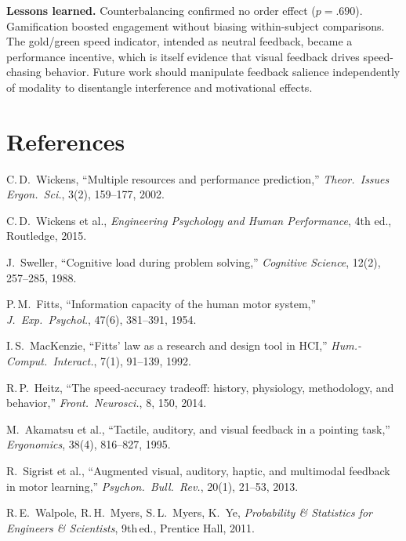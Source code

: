 \documentclass[12pt,letterpaper]{article}
\begin{document}
\textbf{Lessons learned.} Counterbalancing confirmed no order effect ($p = .690$). Gamification boosted engagement without biasing within-subject comparisons. The gold/green speed indicator, intended as neutral feedback, became a performance incentive, which is itself evidence that visual feedback drives speed-chasing behavior. Future work should manipulate feedback salience independently of modality to disentangle interference and motivational effects.


\section*{References}
{\small
\begin{enumerate}[label={[\arabic*]},leftmargin=1.5em,itemsep=2pt]
  \item C.\,D.\ Wickens, ``Multiple resources and performance prediction,'' \emph{Theor.\ Issues Ergon.\ Sci.}, 3(2), 159--177, 2002.
  \item C.\,D.\ Wickens et al., \emph{Engineering Psychology and Human Performance}, 4th ed., Routledge, 2015.
  \item J.\ Sweller, ``Cognitive load during problem solving,'' \emph{Cognitive Science}, 12(2), 257--285, 1988.
  \item P.\,M.\ Fitts, ``Information capacity of the human motor system,'' \emph{J.\ Exp.\ Psychol.}, 47(6), 381--391, 1954.
  \item I.\,S.\ MacKenzie, ``Fitts' law as a research and design tool in HCI,'' \emph{Hum.-Comput.\ Interact.}, 7(1), 91--139, 1992.
  \item R.\,P.\ Heitz, ``The speed-accuracy tradeoff: history, physiology, methodology, and behavior,'' \emph{Front.\ Neurosci.}, 8, 150, 2014.
  \item M.\ Akamatsu et al., ``Tactile, auditory, and visual feedback in a pointing task,'' \emph{Ergonomics}, 38(4), 816--827, 1995.
  \item R.\ Sigrist et al., ``Augmented visual, auditory, haptic, and multimodal feedback in motor learning,'' \emph{Psychon.\ Bull.\ Rev.}, 20(1), 21--53, 2013.
  \item R.\,E.\ Walpole, R.\,H.\ Myers, S.\,L.\ Myers, K.\ Ye, \emph{Probability \& Statistics for Engineers \& Scientists}, 9th\,ed., Prentice Hall, 2011.
\end{enumerate}
}


\newpage
\appendix
\end{document}
